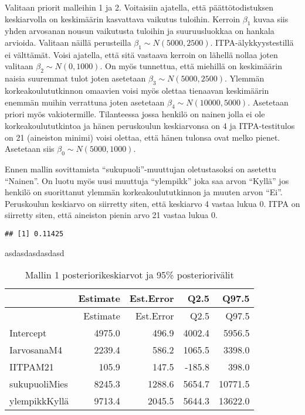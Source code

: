 \documentclass[
]{article}
\begin{document}
Valitaan priorit malleihin 1 ja 2. Voitaisiin ajatella, että päättötodistuksen keskiarvolla on keskimäärin kasvattava vaikutus tuloihin. Kerroin \(\beta_1\) kuvaa siis yhden arvosanan nousun vaikutusta tuloihin ja suuruusluokkaa on hankala arvioida. Valitaan näillä perusteilla \(\beta_1 \sim N(5000, 2500)\). ITPA-älykkyystestillä ei välttämät. Voisi ajatella, että sitä vastaava kerroin on lähellä nollaa joten valitaan \(\beta_2 \sim N(0, 1000)\). On myös tunnettua, että miehillä on keskimäärin naisia suuremmat tulot joten asetetaan \(\beta_3 \sim N(5000, 2500)\). Ylemmän korkeakoulututkinnon omaavien voisi myös olettaa tienaavan keskimäärin enemmän muihin verrattuna joten asetetaan \(\beta_4 \sim N(10000, 5000)\). Asetetaan priori myös vakiotermille. Tilanteessa jossa henkilö on nainen jolla ei ole korkeakoulututkintoa ja hänen peruskoulun keskiarvonsa on 4 ja ITPA-testitulos on 21 (aineiston minimi) voisi olettaa, että hänen tulonsa ovat melko pienet. Asetetaan siis \(\beta_0 \sim N(5000, 1000)\).

Ennen mallin sovittamista ``sukupuoli''-muuttujan oletustasoksi on asetettu ``Nainen''. On luotu myös uusi muuttuja ``ylempikk'' joka saa arvon ``Kyllä'' jos henkilö on suorittanut ylemmän korkeakoulututkinnon ja muuten arvon ``Ei''. Peruskoulun keskiarvo on siirretty siten, että keskiarvo 4 vastaa lukua 0. ITPA on siirretty siten, että aineiston pienin arvo 21 vastaa lukua 0.

\begin{verbatim}
## [1] 0.11425
\end{verbatim}

asdasdasdasdasd

\begin{longtable}[]{@{}lrrrr@{}}
\caption{\label{tab:Malli1}Mallin 1 posteriorikeskiarvot ja 95\% posteriorivälit}\tabularnewline
\toprule\noalign{}
& Estimate & Est.Error & Q2.5 & Q97.5 \\
\midrule\noalign{}
\endfirsthead
\toprule\noalign{}
& Estimate & Est.Error & Q2.5 & Q97.5 \\
\midrule\noalign{}
\endhead
\bottomrule\noalign{}
\endlastfoot
Intercept & 4975.0 & 496.9 & 4002.4 & 5956.5 \\
IarvosanaM4 & 2239.4 & 586.2 & 1065.5 & 3398.0 \\
IITPAM21 & 105.9 & 147.5 & -185.8 & 398.0 \\
sukupuoliMies & 8245.3 & 1288.6 & 5654.7 & 10771.5 \\
ylempikkKyllä & 9713.4 & 2045.5 & 5644.3 & 13622.0 \\
\end{longtable}
\end{document}
